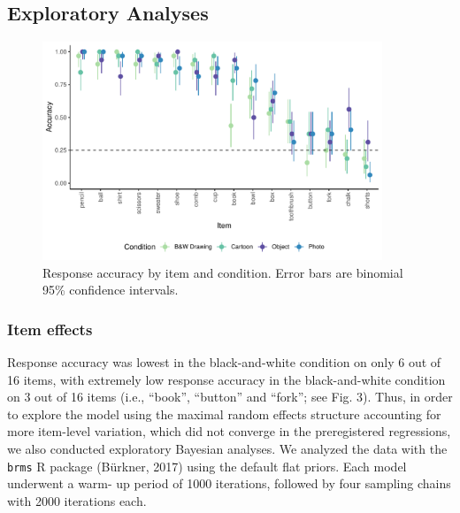 \documentclass[10pt, letterpaper]{article}
\begin{document}
\subsection{Exploratory Analyses}\label{exploratory-analyses}

\begin{CodeChunk}
\begin{figure}[tb]

{\centering \includegraphics[width=4in]{figs/fig3-1} 

}

\caption[Response accuracy by item and condition]{Response accuracy by item and condition. Error bars are binomial 95\% confidence intervals.}\label{fig:fig3}
\end{figure}
\end{CodeChunk}

\subsubsection{Item effects}\label{item-effects}

Response accuracy was lowest in the black-and-white condition on only 6
out of 16 items, with extremely low response accuracy in the
black-and-white condition on 3 out of 16 items (i.e., ``book'',
``button'' and ``fork''; see Fig. 3). Thus, in order to explore the
model using the maximal random effects structure accounting for more
item-level variation, which did not converge in the preregistered
regressions, we also conducted exploratory Bayesian analyses. We
analyzed the data with the \texttt{brms} R package (Bürkner, 2017) using
the default flat priors. Each model underwent a warm- up period of 1000
iterations, followed by four sampling chains with 2000 iterations each.
\end{document}
